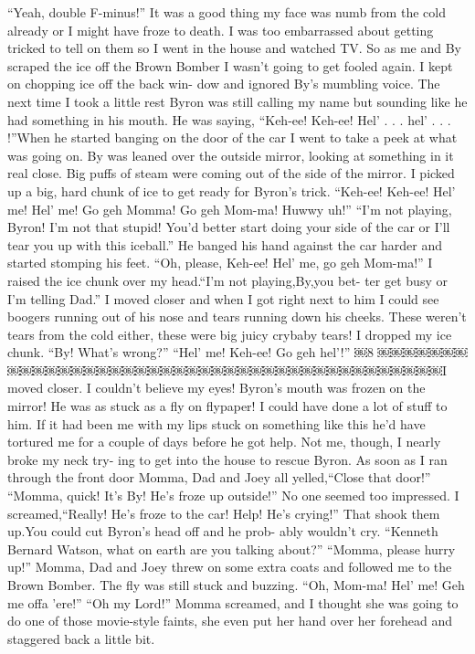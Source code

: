 \documentclass{standard}
\begin{document}
“Yeah, double F-minus!”
It was a good thing my face was numb from the cold already or I might have froze to death. I was too embarrassed about getting tricked to tell on them so I went in the house and watched TV.
So as me and By scraped the ice off the Brown Bomber I wasn’t going to get fooled again. I kept on chopping ice off the back win- dow and ignored By’s mumbling voice.
The next time I took a little rest Byron was still calling my name but sounding like he had something in his mouth. He was saying, “Keh-ee! Keh-ee! Hel’ . . . hel’ . . . !”When he started banging on the door of the car I went to take a peek at what was going on.
By was leaned over the outside mirror, looking at something in it real close. Big puffs of steam were coming out of the side of the mirror.
I picked up a big, hard chunk of ice to get ready for Byron’s trick.
“Keh-ee! Keh-ee! Hel’ me! Hel’ me! Go geh Momma! Go geh Mom-ma! Huwwy uh!”
“I’m not playing, Byron! I’m not that stupid! You’d better start doing your side of the car or I’ll tear you up with this iceball.”
He banged his hand against the car harder and started stomping his feet. “Oh, please, Keh-ee! Hel’ me, go geh Mom-ma!”
I raised the ice chunk over my head.“I’m not playing,By,you bet- ter get busy or I’m telling Dad.”
I moved closer and when I got right next to him I could see boogers running out of his nose and tears running down his cheeks. These weren’t tears from the cold either, these were big juicy crybaby tears! I dropped my ice chunk.
“By! What’s wrong?”
“Hel’ me! Keh-ee! Go geh hel’!”
￼8
￼￼￼￼￼￼￼￼￼￼￼￼￼￼￼￼￼￼￼￼￼￼￼￼￼￼￼￼￼￼￼￼￼￼￼￼￼￼￼￼￼I moved closer. I couldn’t believe my eyes! Byron’s mouth was frozen on the mirror! He was as stuck as a fly on flypaper!
I could have done a lot of stuff to him. If it had been me with my lips stuck on something like this he’d have tortured me for a couple of days before he got help. Not me, though, I nearly broke my neck try- ing to get into the house to rescue Byron.
As soon as I ran through the front door Momma, Dad and Joey all yelled,“Close that door!”
“Momma, quick! It’s By! He’s froze up outside!”
No one seemed too impressed.
I screamed,“Really! He’s froze to the car! Help! He’s crying!” That shook them up.You could cut Byron’s head off and he prob-
ably wouldn’t cry.
“Kenneth Bernard Watson, what on earth are you talking about?” “Momma, please hurry up!”
Momma, Dad and Joey threw on some extra coats and followed me
to the Brown Bomber.
The fly was still stuck and buzzing. “Oh, Mom-ma! Hel’ me! Geh
me offa ’ere!”
“Oh my Lord!” Momma screamed, and I thought she was going to
do one of those movie-style faints, she even put her hand over her forehead and staggered back a little bit.
\end{document}
